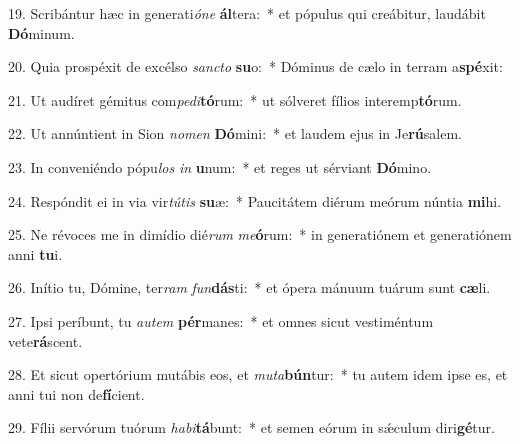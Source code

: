 19. Scribántur hæc in generati\textit{ó}\textit{ne} \textbf{ál}tera:~*  et pópulus qui creábitur, laudábit \textbf{Dó}minum.\

20. Quia prospéxit de excélso \textit{sanc}\textit{to} \textbf{su}o:~*  Dóminus de cælo in terram a\textbf{spé}xit:\

21. Ut audíret gémitus com\textit{pe}\textit{di}\textbf{tó}rum:~*  ut sólveret fílios interemp\textbf{tó}rum.\

22. Ut annúntient in Sion \textit{no}\textit{men} \textbf{Dó}mini:~*  et laudem ejus in Je\textbf{rú}salem.\

23. In conveniéndo pópu\textit{los} \textit{in} \textbf{u}num:~*  et reges ut sérviant \textbf{Dó}mino.\

24. Respóndit ei in via vir\textit{tú}\textit{tis} \textbf{su}æ:~*  Paucitátem diérum meórum núntia \textbf{mi}hi.\

25. Ne révoces me in dimídio dié\textit{rum} \textit{me}\textbf{ó}rum:~*  in generatiónem et generatiónem anni \textbf{tu}i.\

26. Inítio tu, Dómine, ter\textit{ram} \textit{fun}\textbf{dás}ti:~*  et ópera mánuum tuárum sunt \textbf{cæ}li.\

27. Ipsi períbunt, tu \textit{au}\textit{tem} \textbf{pér}manes:~*  et omnes sicut vestiméntum vete\textbf{rá}scent.\

28. Et sicut opertórium mutábis eos, et \textit{mu}\textit{ta}\textbf{bún}tur:~*  tu autem idem ipse es, et anni tui non de\textbf{fí}cient.\

29. Fílii servórum tuórum \textit{ha}\textit{bi}\textbf{tá}bunt:~*  et semen eórum in sǽculum diri\textbf{gé}tur.\

